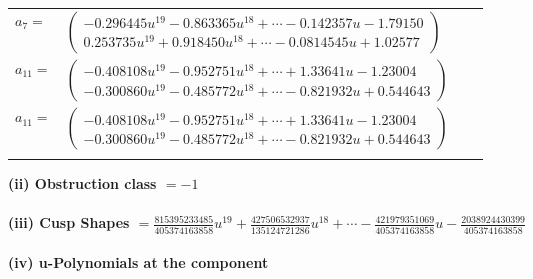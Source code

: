 \documentclass[1p]{elsarticle_modified}
\theoremstyle{definition}
\begin{document}
\begin{tabular}{m{7pt} m{180pt} m{7pt} m{180pt} }
\flushright $a_{7}=$&$\begin{pmatrix}-0.296445 u^{19}-0.863365 u^{18}+\cdots-0.142357 u-1.79150\\0.253735 u^{19}+0.918450 u^{18}+\cdots-0.0814545 u+1.02577\end{pmatrix}$ \\
\flushright $a_{11}=$&$\begin{pmatrix}-0.408108 u^{19}-0.952751 u^{18}+\cdots+1.33641 u-1.23004\\-0.300860 u^{19}-0.485772 u^{18}+\cdots-0.821932 u+0.544643\end{pmatrix}$\\ \flushright $a_{11}=$&$\begin{pmatrix}-0.408108 u^{19}-0.952751 u^{18}+\cdots+1.33641 u-1.23004\\-0.300860 u^{19}-0.485772 u^{18}+\cdots-0.821932 u+0.544643\end{pmatrix}$\\&\end{tabular}
\flushleft \textbf{(ii) Obstruction class $= -1$}\\~\\
\flushleft \textbf{(iii) Cusp Shapes $= \frac{815395233485}{405374163858} u^{19}+\frac{427506532937}{135124721286} u^{18}+\cdots-\frac{421979351069}{405374163858} u-\frac{2038924430399}{405374163858}$}\\~\\
\newpage\renewcommand{\arraystretch}{1}
\flushleft \textbf{(iv) u-Polynomials at the component}\newline \\
\end{document}
